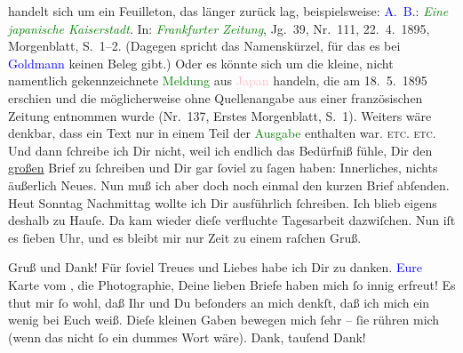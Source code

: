 {{{                  handelt sich um ein Feuilleton, das länger zurück lag, beispielsweise: \textcolor{blue}{A. B.}: \emph{\textcolor{green}{Eine japanische Kaiserstadt}}. In: \emph{\textcolor{green}{Frankfurter Zeitung}}, Jg. 39, Nr. 111, 22. 4. 1895,
                     Morgenblatt, S. 1–2. (Dagegen spricht das Namenskürzel, für das es bei
                     \textcolor{blue}{Goldmann} keinen Beleg gibt.) Oder es
                  könnte sich um die kleine, nicht namentlich gekennzeichnete \textcolor{green}{Meldung} aus \textcolor{pink}{Japan} handeln, die am 18. 5. 1895 erschien und
                  die möglicherweise ohne Quellenangabe aus einer französischen Zeitung entnommen
                  wurde (Nr. 137, Erstes Morgenblatt, S. 1). Weiters wäre denkbar, dass
                  ein Text nur in einem Teil der \textcolor{green}{Ausgabe} enthalten war.}}}\label{K_L02735-456h}{ }\textsc{etc. etc.} Und dann ſchreibe ich Dir nicht, weil ich endlich
               das Bedürfniß {\pb}fühle, Dir den \uline{großen} Brief zu ſchreiben und Dir gar ſoviel zu ſagen haben:
               Innerliches, nichts äußerlich Neues. Nun muß ich aber doch  noch einmal den kurzen Brief abſenden. Heut Sonntag{ }Nachmittag wollte ich Dir ausführlich ſchreiben. Ich blieb eigens
               deshalb zu Hauſe. Da kam wieder dieſe verfluchte Tagesarbeit dazwiſchen. Nun iſt es
                  ſieben Uhr, und es bleibt mir nur Zeit zu einem {\pb}raſchen Gruß.\pend
           
\pstart
           Gruß und Dank! Für ſoviel Treues und Liebes habe ich Dir zu danken. \textcolor{blue}{Eure}{}\ledrightnote{{$\rightarrow$}\textcolor{blue}{Lou Andreas-Salomé}{\newline}{$\rightarrow$}\textcolor{blue}{Richard Beer-Hofmann}} Karte vom \label{K_L02735-1v}\label{K_L02735-1h}, die
               Photographie, Deine lieben Briefe haben mich ſo innig erfreut! Es thut mir ſo wohl,
               daß Ihr und Du beſonders an mich denkſt, daß ich mich ein wenig bei Euch weiß. Dieſe
               kleinen Gaben bewegen mich ſehr – ſie rühren mich (wenn das nicht {\pb}ſo ein dummes Wort wäre). Dank, tauſend Dank!\pend
           
